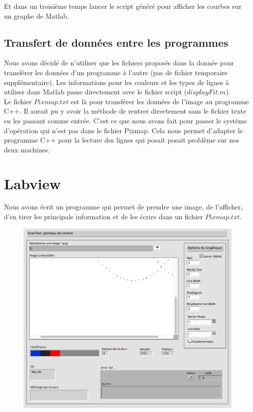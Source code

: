 \documentclass[11pt, a4paper, oneside]{article}   	%
\begin{document}
Et dans un troisième temps lancer le script généré pour afficher les courbes sur un graphe de Matlab.

\subsection{Transfert de données entre les programmes}

Nous avons décidé de n'utiliser que les fichiers proposés dans la donnée pour transférer les données d'un programme à l'autre (pas de fichier temporaire supplémentaire). Les informations pour les couleurs et les types de lignes à utiliser dans Matlab passe directement avec le fichier script ($displayFit.m$).\\

Le fichier $Pixmap.txt$ est là pour transférer les données de l'image au programme C++. Il aurait pu y avoir la méthode de rentrer directement sans le fichier texte en les passant comme entrée. C'est ce que nous avons fait pour passer le système d'opération qui n'est pas dans le fichier Pixmap. Cela nous permet d'adapter le programme C++ pour la lecture des lignes qui posait posait problème sur nos deux machines.

\clearpage
\section{Labview}
Nous avons écrit un programme qui permet de prendre une image, de l'afficher, d'en tirer les principale information et de les écrire dans un fichier $Pixmap.txt$.

\begin{figure}[H]
\begin{center}
	\includegraphics[scale =0.5]{images/display}
\end{center}
\end{figure}
\end{document}
